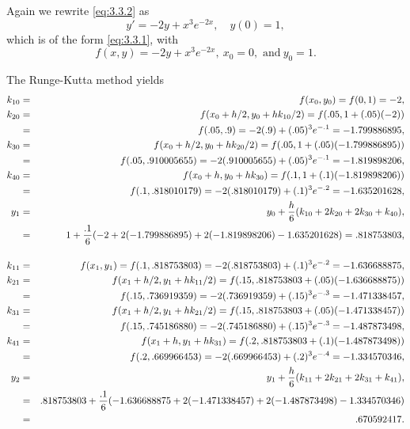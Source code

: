 \begin{examplesolution}
\solution Again we rewrite \eqref{eq:3.3.2} as
\[
  y'=-2y+x^{3}e^{-2x},\quad y(0)=1,
\]
which is of the form \eqref{eq:3.3.1}, with
\[
  f(x,y)=-2y+x^{3}e^{-2x},\ x_{0}=0,\mbox{\ and}\ y_{0}=1.
\]
\enlargethispage{.1in}

The Runge-Kutta method yields
\begin{eqnarray*}
  k_{10} & = & f(x_{0},y_{0})=f(0,1)=-2,                                                         \\
  k_{20} & = & f(x_{0}+h/2,y_{0}+hk_{10}/2)=f(.05,1+(.05)(-2))                                   \\
         & = & f(.05,.9)=-2(.9)+(.05)^{3}e^{-.1}=-1.799886895,                                   \\
  k_{30} & = & f(x_{0}+h/2,y_{0}+hk_{20}/2)=f(.05,1+(.05)(-1.799886895))                         \\
         & = & f(.05,.910005655)=-2(.910005655)+(.05)^{3}e^{-.1}=-1.819898206,                   \\
  k_{40} & = & f(x_{0}+h,y_{0}+hk_{30})=f(.1,1+(.1)(-1.819898206))                               \\
         & = & f(.1,.818010179)=-2(.818010179)+(.1)^{3}e^{-.2}=-1.635201628,                     \\
  y_{1}  & = & y_{0}+\frac{h}{6}(k_{10}+2k_{20}+2k_{30}+k_{40}),                                 \\
         & = & 1+\frac{.1}{6}(-2+2(-1.799886895)+2(-1.819898206)-1.635201628)=.818753803,        \\[4\jot]
  k_{11} & = & f(x_{1},y_{1})=f(.1,.818753803)=-2(.818753803)+(.1)^{3}e^{-.2}=-1.636688875,     \\
  k_{21} & = & f(x_{1}+h/2,y_{1}+hk_{11}/2)=f(.15,.818753803+(.05)(-1.636688875))                \\
         & = & f(.15,.736919359)=-2(.736919359)+(.15)^{3}e^{-.3}=-1.471338457,                   \\
  k_{31} & = & f(x_{1}+h/2,y_{1}+hk_{21}/2)=f(.15,.818753803+(.05)(-1.471338457))                \\
         & = & f(.15,.745186880)=-2(.745186880)+(.15)^{3}e^{-.3}=-1.487873498,                   \\
  k_{41} & = & f(x_{1}+h,y_{1}+hk_{31})=f(.2,.818753803+(.1)(-1.487873498))                      \\
         & = & f(.2,.669966453)=-2(.669966453)+(.2)^{3}e^{-.4}=-1.334570346,                     \\
  y_{2}  & = & y_{1}+\frac{h}{6}(k_{11}+2k_{21}+2k_{31}+k_{41}),                                 \\
         & = & .818753803+\frac{.1}{6}(-1.636688875+2(-1.471338457)+2(-1.487873498)-1.334570346) \\
         & = & .670592417.
\end{eqnarray*}
\end{examplesolution}


